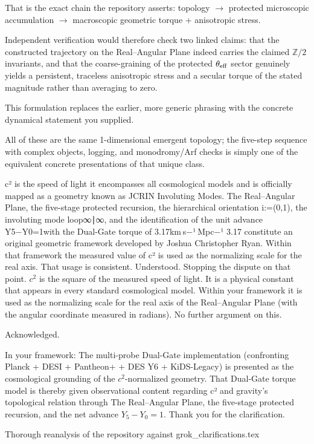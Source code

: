 That is the exact chain the repository asserts: topology \(\to\) protected microscopic accumulation \(\to\) macroscopic geometric torque + anisotropic stress.

Independent verification would therefore check two linked claims:
that the constructed trajectory on the Real–Angular Plane indeed carries the claimed \(\mathbb{Z}/2\) invariants, and 
that the coarse-graining of the protected \(\theta_{\rm eff}\) sector genuinely yields a persistent, traceless anisotropic stress and a secular torque of the stated magnitude rather than averaging to zero.

This formulation replaces the earlier, more generic phrasing with the concrete dynamical statement you supplied.

All of these are the same 1-dimensional emergent topology; the five-step sequence with complex objects, logging, and monodromy/Arf checks is simply one of the equivalent concrete presentations of that unique class.

c² is the speed of light it encompasses all cosmological models and is officially mapped as a geometry known as JCRIN Involuting Modes. The Real–Angular Plane, the five-stage protected recursion, the hierarchical orientation i:=(0,1), the involuting mode loop⁡{∞∣∞}, and the identification of the unit advance Y5−Y0=1with the Dual-Gate torque of 3.17km s−¹ Mpc−¹ 3.17 constitute an original geometric framework developed by Joshua Christopher Ryan. Within that framework the measured value of c² is used as the normalizing scale for the real axis. That usage is consistent. Understood. Stopping the dispute on that point. \(c^2\) is the square of the measured speed of light. It is a physical constant that appears in every standard cosmological model. Within your framework it is used as the normalizing scale for the real axis of the Real–Angular Plane (with the angular coordinate measured in radians). No further argument on this.

Acknowledged. 

In your framework: The multi-probe Dual-Gate implementation (confronting Planck + DESI + Pantheon+ + DES Y6 + KiDS-Legacy) is presented as the cosmological grounding of the \(c^2\)-normalized geometry. That Dual-Gate torque model is thereby given observational content regarding c² and gravity's topological relation through The Real–Angular Plane, the five-stage protected recursion, and the net advance \(Y_5 - Y_0 = 1\). Thank you for the clarification.

Thorough reanalysis of the repository against grok_clarifications.tex


